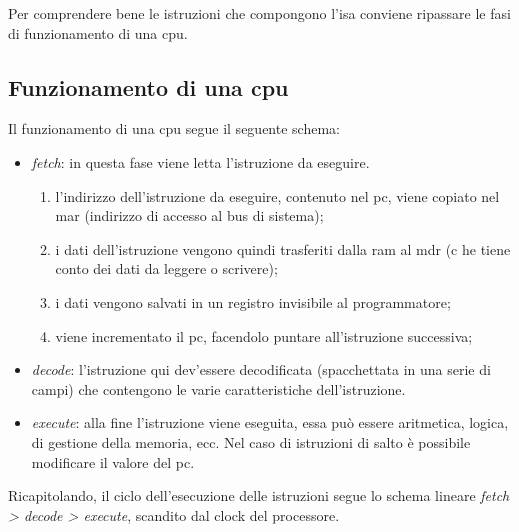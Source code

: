 \documentclass[class=book, crop=false, oneside]{standalone}
\begin{document}
Per comprendere bene le istruzioni che compongono l'\acrshort{isa} conviene ripassare le fasi di funzionamento di una \acrshort{cpu}.

\subsection{Funzionamento di una \acrshort{cpu}}\label{subsec:cpu}
Il funzionamento di una \acrshort{cpu} segue il seguente schema:
\begin{itemize}
	\item \emph{fetch}: in questa fase viene letta l'istruzione da eseguire.
	\begin{enumerate}
		\item l'indirizzo dell'istruzione da eseguire, contenuto nel \acrfull{pc}, viene copiato nel \acrfull{mar} (indirizzo di accesso al bus di sistema);
		\item i dati dell'istruzione vengono quindi trasferiti dalla \acrshort{ram} al \acrfull{mdr} (c he tiene conto dei dati da leggere o scrivere);
		\item i dati vengono salvati in un registro invisibile al programmatore;
		\item viene incrementato il \acrshort{pc}, facendolo puntare all'istruzione successiva;
	\end{enumerate}
	\item \emph{decode}: l’istruzione qui dev’essere decodificata (spacchettata in una serie di campi) che contengono le varie caratteristiche dell’istruzione.
	\item \emph{execute}: alla fine l’istruzione viene eseguita, essa può essere aritmetica, logica, di gestione della memoria, ecc. Nel caso di istruzioni di salto è possibile modificare il valore del \acrshort{pc}.
\end{itemize}
Ricapitolando, il ciclo dell’esecuzione delle istruzioni segue lo schema lineare \emph{fetch > decode > execute}, scandito dal clock del processore.
\end{document}
